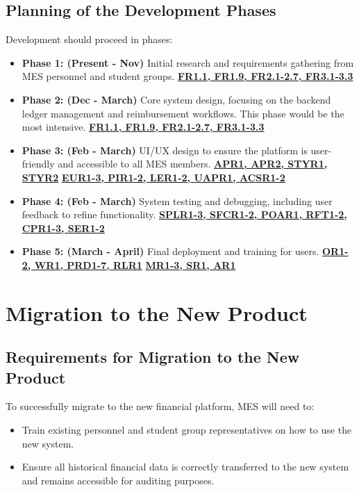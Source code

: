 \documentclass[12pt]{article}
\begin{document}
\subsection{Planning of the Development Phases}
Development should proceed in phases:
\begin{itemize}
    \item \textbf{Phase 1: (Present - Nov)} Initial research and requirements gathering from MES personnel and student groups. \textbf{\hyperref[FROne]{FR1.1, FR1.9, FR2.1-2.7, FR3.1-3.3}} 
    \item \textbf{Phase 2: (Dec - March)} Core system design, focusing on the backend ledger management and reimbursement workflows. This phase would be the most intensive. \textbf{\hyperref[FROne]{FR1.1, FR1.9, FR2.1-2.7, FR3.1-3.3}}
    \item \textbf{Phase 3: (Feb - March) } UI/UX design to ensure the platform is user-friendly and accessible to all MES members. \textbf{\hyperref[LookAndFeel]{APR1, APR2, STYR1, STYR2}} \textbf{\hyperref[UseandHum]{EUR1-3, PIR1-2, LER1-2, UAPR1, ACSR1-2}}
    \item \textbf{Phase 4: (Feb - March)} System testing and debugging, including user feedback to refine functionality. \textbf{\hyperref[PerformanceReq]{SPLR1-3, SFCR1-2, POAR1, RFT1-2, CPR1-3, SER1-2}}
    \item \textbf{Phase 5: (March - April)} Final deployment and training for users. \textbf{\hyperref[OpsandEnv]{OR1-2, WR1, PRD1-7, RLR1}} \textbf{\hyperref[MaintainSupport]{MR1-3, SR1, AR1}}
\end{itemize}

\section{Migration to the New Product}
\subsection{Requirements for Migration to the New Product}
To successfully migrate to the new financial platform, MES will need to:
\begin{itemize}
    \item Train existing personnel and student group representatives on how to use the new system.
    \item Ensure all historical financial data is correctly transferred to the new system and remains accessible for auditing purposes.
\end{itemize}
\end{document}
